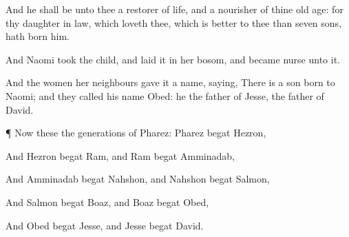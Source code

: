 {And he shall be unto thee a
restorer of
{}
life, and a
nourisher of thine old
age: for thy daughter in
law, which
loveth thee, which is
better to thee than
seven
sons, hath
born him.

And
Naomi
took the
child, and
laid it in her
bosom, and became
nurse unto it.

And the women her
neighbours
gave it a
name,
saying, There is a
son
born to
Naomi; and they
called his
name
Obed: he
{} the
father of
Jesse, the
father of
David.


\par }{\PP {}¶ Now these
{} the
generations of
Pharez:
Pharez
begat
Hezron,

And
Hezron
begat
Ram, and
Ram
begat
Amminadab,

And
Amminadab
begat
Nahshon, and
Nahshon
begat
Salmon,

And
Salmon
begat
Boaz, and
Boaz
begat
Obed,

And
Obed
begat
Jesse, and
Jesse
begat
David.


\par }